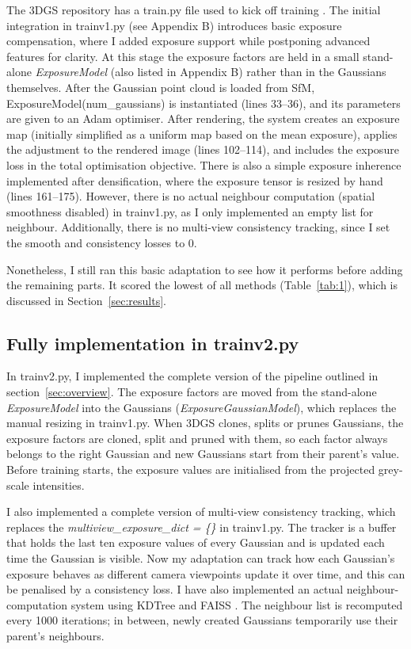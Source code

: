 \documentclass[11pt,a4paper]{article}
\begin{document}
The 3DGS repository has a train.py file used to kick off training \cite{ref30}. The initial integration in trainv1.py (see Appendix B) introduces basic exposure compensation, where I added exposure support while postponing advanced features for clarity. At this stage the exposure factors are held in a small stand-alone \textit{ExposureModel} (also listed in Appendix B) rather than in the Gaussians themselves. After the Gaussian point cloud is loaded from SfM, ExposureModel(num\_gaussians) is instantiated (lines 33--36), and its parameters are given to an Adam optimiser. After rendering, the system creates an exposure map (initially simplified as a uniform map based on the mean exposure), applies the adjustment to the rendered image (lines 102--114), and includes the exposure loss in the total optimisation objective. There is also a simple exposure inherence implemented after densification, where the exposure tensor is resized by hand (lines 161--175). However, there is no actual neighbour computation (spatial smoothness disabled) in trainv1.py, as I only implemented an empty list for neighbour. Additionally, there is no multi-view consistency tracking, since I set the smooth and consistency losses to 0.

Nonetheless, I still ran this basic adaptation to see how it performs before adding the remaining parts. It scored the lowest of all methods (Table~\ref{tab:1}), which is discussed in Section~\ref{sec:results}.

\subsection{Fully implementation in trainv2.py}

In trainv2.py, I implemented the complete version of the pipeline outlined in section~\ref{sec:overview}. The exposure factors are moved from the stand-alone \textit{ExposureModel} into the Gaussians (\textit{ExposureGaussianModel}), which replaces the manual resizing in trainv1.py. When 3DGS clones, splits or prunes Gaussians, the exposure factors are cloned, split and pruned with them, so each factor always belongs to the right Gaussian and new Gaussians start from their parent's value. Before training starts, the exposure values are initialised from the projected grey-scale intensities.

I also implemented a complete version of multi-view consistency tracking, which replaces the \textit{multiview\_exposure\_dict = \{\}} in trainv1.py. The tracker is a buffer that holds the last ten exposure values of every Gaussian and is updated each time the Gaussian is visible. Now my adaptation can track how each Gaussian's exposure behaves as different camera viewpoints update it over time, and this can be penalised by a consistency loss. I have also implemented an actual neighbour-computation system using KDTree \cite{ref17} and FAISS \cite{ref18}. The neighbour list is recomputed every 1000 iterations; in between, newly created Gaussians temporarily use their parent's neighbours.
\end{document}
